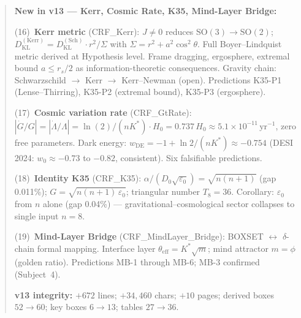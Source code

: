 \documentclass[12pt, a4paper]{article}
\begin{document}
\begin{abstract}
\textbf{New in v13 --- Kerr, Cosmic Rate, K35, Mind-Layer Bridge:}

(16)~\textbf{Kerr metric} (CRF\_Kerr): $J\neq 0$ reduces $\mathrm{SO}(3)\to\mathrm{SO}(2)$;
$D_{\mathrm{KL}}^{(\mathrm{Kerr})} = D_{\mathrm{KL}}^{(\mathrm{Sch})}\cdot r^2/\Sigma$
with $\Sigma = r^2+a^2\cos^2\theta$. Full Boyer--Lindquist metric derived at Hypothesis
level. Frame dragging, ergosphere, extremal bound $a\leq r_s/2$ as information-theoretic
consequences. Gravity chain: Schwarzschild $\to$ Kerr $\to$ Kerr--Newman (open).
Predictions K35-P1 (Lense--Thirring), K35-P2 (extremal bound), K35-P3 (ergosphere).

(17)~\textbf{Cosmic variation rate} (CRF\_GtRate):
$|\dot{G}/G| = |\dot{\Lambda}/\Lambda| = \ln(2)/(nK^*)\cdot H_0 = 0.737\,H_0
\approx 5.1\times 10^{-11}\,\mathrm{yr}^{-1}$, zero free parameters.
Dark energy: $w_{\mathrm{DE}} = -1 + \ln 2/(nK^*) \approx -0.754$
(DESI 2024: $w_0\approx -0.73$ to $-0.82$, consistent). Six falsifiable predictions.

(18)~\textbf{Identity K35} (CRF\_K35): $\alpha/(D_0\sqrt{\varepsilon_0}) = \sqrt{n(n+1)}$
(gap 0.011\%); $G = \sqrt{n(n+1)\,\varepsilon_0}$; triangular number $T_8 = 36$.
Corollary: $\varepsilon_0$ from $n$ alone (gap 0.04\%) --- gravitational--cosmological
sector collapses to single input $n = 8$.

(19)~\textbf{Mind-Layer Bridge} (CRF\_MindLayer\_Bridge): BOXSET $\leftrightarrow$ $\delta$-chain
formal mapping. Interface layer $\theta_{\mathrm{eff}} = K^*\sqrt{m}$; mind attractor
$m = \phi$ (golden ratio). Predictions MB-1 through MB-6; MB-3 confirmed (Subject~4).

\textbf{v13 integrity:} $+672$ lines; $+34{,}460$ chars; $+10$ pages; derived boxes
$52\to 60$; key boxes $6\to 13$; tables $27\to 36$.


\end{abstract}
\end{document}
